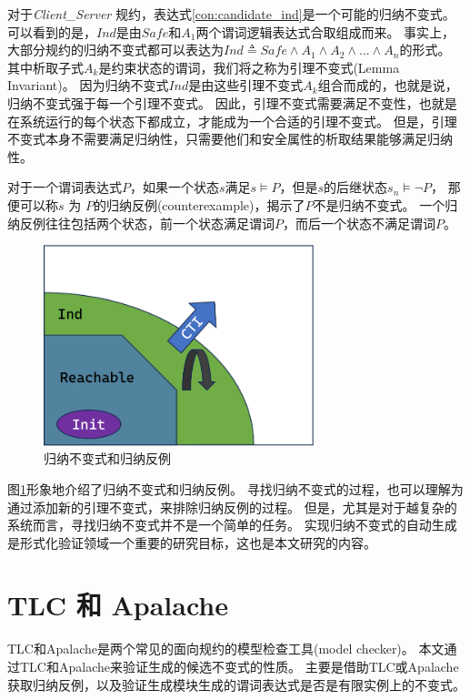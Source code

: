 对于\textit{Client\_Server} 规约，表达式\ref{con:candidate_ind}是一个可能的归纳不变式。
可以看到的是，$Ind$是由$Safe$和$A_{1}$两个谓词逻辑表达式合取组成而来。
事实上，大部分规约的归纳不变式都可以表达为$Ind \triangleq Safe \wedge A_1 \wedge A_2 \wedge... \wedge A_n$的形式。
其中析取子式$A_k$是约束状态的谓词，我们将之称为引理不变式(Lemma Invariant)。
因为归纳不变式$Ind$是由这些引理不变式$A_k$组合而成的，也就是说，归纳不变式强于每一个引理不变式。
因此，引理不变式需要满足不变性，也就是在系统运行的每个状态下都成立，才能成为一个合适的引理不变式。
但是，引理不变式本身不需要满足归纳性，只需要他们和安全属性的析取结果能够满足归纳性。

对于一个谓词表达式$P$，如果一个状态$s$满足$s \models P$，但是$s$的后继状态$s_{n} \models \neg P$，
那便可以称$s$ 为 $P$的归纳反例(counterexample)，揭示了$P$不是归纳不变式。
一个归纳反例往往包括两个状态，前一个状态满足谓词$P$，而后一个状态不满足谓词$P$。

\begin{figure}
    \centering
    \includegraphics[width=0.7\textwidth]{figures/ind-cti.pdf}
    \caption{归纳不变式和归纳反例}
    \label{fig:ind-cti}
\end{figure}
图\ref{fig:ind-cti}形象地介绍了归纳不变式和归纳反例。
寻找归纳不变式的过程，也可以理解为通过添加新的引理不变式，来排除归纳反例的过程。
但是，尤其是对于越复杂的系统而言，寻找归纳不变式并不是一个简单的任务。
实现归纳不变式的自动生成是形式化验证领域一个重要的研究目标，这也是本文研究的内容。

\section{TLC 和 Apalache}
TLC和Apalache是两个常见的面向\TLA 规约的模型检查工具(model checker)。
本文通过TLC和Apalache来验证生成的候选不变式的性质。
主要是借助TLC或Apalache获取归纳反例，以及验证生成模块生成的谓词表达式是否是有限实例上的不变式。

